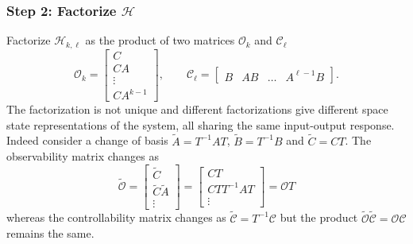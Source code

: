 \subsubsection{Step 2: Factorize $\mathcal{H}$}
\label{sec:factorize-Hankel}

Factorize $\mathcal{H}_{k,\ell}$ as the product of two matrices $\mathcal{O}_k$ and $\mathcal{C}_\ell$
\begin{equation}
  \label{eq:extended-observability-controllability-matrices}
  \mathcal{O}_k =
  \begin{bmatrix}
    C \\ CA \\ \vdots \\ CA^{k-1}
  \end{bmatrix},\qquad \mathcal{C}_\ell =
  \begin{bmatrix}
    B & AB & \ldots & A^{\ell-1}B
  \end{bmatrix}.
\end{equation}
The factorization is not unique and different factorizations give different space state representations of the system, all sharing the same input-output response. Indeed consider a change of basis $\tilde{A} = T^{-1}AT$, $\tilde{B} = T^{-1}B$ and $\tilde{C} = CT$. The observability matrix changes as
\begin{equation*}
  \tilde{\mathcal{O}} =
  \begin{bmatrix}
    \tilde{C} \\ \tilde{C}\tilde{A} \\ \vdots
  \end{bmatrix} =
  \begin{bmatrix}
    CT \\ CTT^{-1}AT \\ \vdots
  \end{bmatrix} = \mathcal{O}T
\end{equation*}
whereas the controllability matrix changes as $\tilde{\mathcal{C}} = T^{-1}\mathcal{C}$ but the product $\tilde{\mathcal{O}}\tilde{\mathcal{C}} = \mathcal{O}\mathcal{C}$ remains the same.

